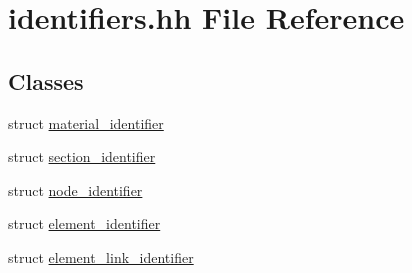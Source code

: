 \hypertarget{identifiers_8hh}{\section{identifiers.\-hh File Reference}
\label{identifiers_8hh}
}
\subsection*{Classes}
\begin{DoxyCompactItemize}
\item 
struct \hyperlink{structmaterial__identifier}{material\-\_\-identifier}
\item 
struct \hyperlink{structsection__identifier}{section\-\_\-identifier}
\item 
struct \hyperlink{structnode__identifier}{node\-\_\-identifier}
\item 
struct \hyperlink{structelement__identifier}{element\-\_\-identifier}
\item 
struct \hyperlink{structelement__link__identifier}{element\-\_\-link\-\_\-identifier}
\end{DoxyCompactItemize}
